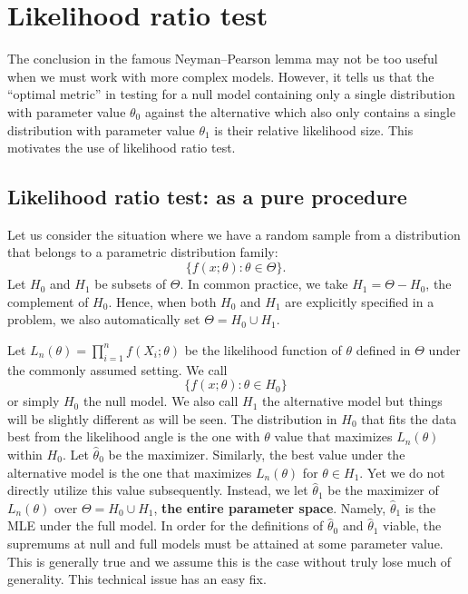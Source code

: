 
\chapter{Likelihood ratio test}

The conclusion in the famous Neyman--Pearson lemma may not be too useful
when we must work with more complex models. However, it tells us
that the ``optimal metric'' in testing for a null model containing only a single
distribution with parameter value $\theta_0$
against the alternative which also only contains a single distribution with parameter
value $\theta_1$ is their relative likelihood size.
This motivates the use of likelihood ratio test.

\section{Likelihood ratio test: as a pure procedure}
Let us consider the situation where we have a random sample from
a distribution that belongs to a parametric distribution family:
\[
\{ f(x; \theta): \theta \in \Theta\}.
\]
Let $H_0$ and $H_1$  be subsets of $\Theta$. In common practice, we
take $H_1 = \Theta - H_0$, the complement of $H_0$. Hence, when both $H_0$ and $H_1$ are
explicitly specified in a problem, we also automatically set $\Theta = H_0 \cup H_1$.

Let $L_n(\theta) = \prod_{i=1}^n f(X_i; \theta)$ be the likelihood function of $\theta$
defined in $\Theta$ under the commonly assumed \iid setting.
We call
\[
\{ f(x; \theta): \theta \in H_0\}
\]
or simply $H_0$ the null model.
We also call $H_1$ the alternative model but things will be slightly different
as will be seen.
The distribution in $H_0$ that fits the data best from the likelihood angle
is the one with $\theta$ value that maximizes
$L_n(\theta)$ within $H_0$. 
Let $\hat \theta_0$ be the maximizer. 
Similarly, the best value under the alternative model is the
one that maximizes $L_n(\theta)$ for $\theta \in H_1$.
Yet we do not directly utilize this value subsequently.
Instead, we let $\hat \theta_1$ be the maximizer
of $L_n(\theta)$ over $\Theta = H_0 \cup H_1$, {\bf the entire parameter space}.
Namely, $\hat \theta_1$ is the MLE under the full model.
In order for the definitions of $\hat \theta_0$ and $\hat \theta_1$ viable,
the supremums at null and full models must be attained at some parameter value. 
This is generally true and we assume this is the case without truly lose
much of generality. This technical issue has an easy fix.

